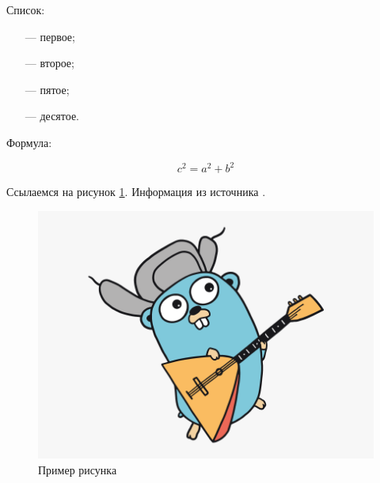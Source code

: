 Список:

\begin{itemize}[leftmargin=1.6\parindent]
	\item[---] первое;
	\item[---] второе;
	\item[---] пятое;
	\item[---] десятое.
\end{itemize}

Формула:

\begin{equation}
c^2 = a^2 + b^2
\end{equation}

Ссылаемся на рисунок \ref{fig:a1}. Информация из источника \cite{golang}.

\begin{figure}[hbtp]
	\centering
	\includegraphics[width=\textwidth]{img/golang.png}
	\caption{Пример рисунка}
	\label{fig:a1}
\end{figure}


\pagebreak